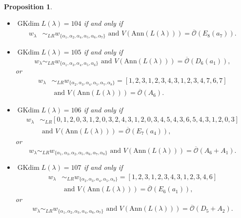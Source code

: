 \documentclass[reqno,12pt]{amsart}
\numberwithin{equation}{section}
\theoremstyle{plain}
\newtheorem{Prop}[Thm]{Proposition}
\theoremstyle{definition}
\newcommand{\lam}{\lambda}
\newcommand{\Ann}{\mathrm{Ann}}
\newcommand{\gkd}{\operatorname{GKdim}}
\begin{document}
\begin{Prop}
\begin{itemize}
    \item[(24)] $\gkd L(\lambda)=104$ if and only if \begin{align*}
          w_{\lambda}&\sim_{LR}w_{\{\alpha_1,\alpha_2,\alpha_4,\alpha_5,\alpha_6,\alpha_7\}}
          \text{~and~} V(\Ann (L(\lam)))=\overline{\mathcal{O}}({E}_8(a_7)).
      \end{align*}
      
      
        \item[(25)] $\gkd L(\lambda)=105$ if and only if $$w_{\lambda}\sim_{LR}
        w_{\{\alpha_1,\alpha_3,\alpha_4,\alpha_5,\alpha_6\}}
        \text{~and~} V(\Ann (L(\lam)))=\overline{\mathcal{O}}({D}_6(a_1)),$$
        or
\begin{align*}w_{\lambda}&\sim_{LR}
w_{\{\alpha_2,\alpha_3,\alpha_4,\alpha_5,\alpha_7,\alpha_8\}}=[1, 2, 3, 1, 2, 3, 4, 3, 1, 2, 3, 4,7,6,7]\\
 &\text{~and~} V(\Ann (L(\lam)))=\overline{\mathcal{O}}(A_6).
 \end{align*}


 
     \item[(26)] $\gkd L(\lambda)=106$ if and only if \begin{align*}
         w_{\lambda}&\sim_{LR}
     [0, 1, 2, 0, 3, 1, 2, 0, 3, 2, 4, 3, 1, 2, 0, 3, 4, 5, 4, 3, 6, 5, 4, 3, 1, 2, 0, 3]\\
     &\text{~and~} V(\Ann (L(\lam)))=\overline{\mathcal{O}}({E}_7(a_4)),
     \end{align*}
      or $$w_{\lambda}\sim_{LR}
     w_{\{\alpha_1,\alpha_3,\alpha_2,\alpha_5,\alpha_6,\alpha_7,\alpha_8\}}\text{~and~} V(\Ann (L(\lam)))=\overline{\mathcal{O}}(A_6+A_1).$$
    
\item[(27)] $\gkd L(\lambda)=107$ if and only if \begin{align*}
    w_{\lambda}&\sim_{LR}
    w_{\{\alpha_2,\alpha_3,\alpha_4,\alpha_5,\alpha_7\}}=[1, 2, 3, 1, 2, 3, 4, 3, 1, 2, 3, 4,6]\\
    &\text{~and~} V(\Ann (L(\lam)))=\overline{\mathcal{O}}({E}_6(a_1)), 
\end{align*}
        or
$$w_{\lambda}\sim_{LR}
w_{\{\alpha_1,\alpha_2,\alpha_3,\alpha_4,\alpha_6,\alpha_7\}} \text{~and~} V(\Ann (L(\lam)))=\overline{\mathcal{O}}(D_5+A_2).$$


\end{itemize}
\end{Prop}
\end{document}
